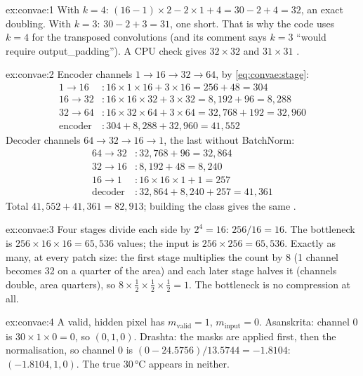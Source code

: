 
\begin{solution}{ex:convae:1}
With $k=4$: $(16-1)\times2-2\times1+4=30-2+4=32$, an exact doubling. With $k=3$: $30-2+3=31$, one short. That is why
the code uses $k=4$ for the transposed convolutions (and its comment says $k=3$ ``would require output\_padding''). A
CPU check gives $32\times32$ and $31\times31$ \tagC.
\end{solution}

\begin{solution}{ex:convae:2}
Encoder channels $1\to16\to32\to64$, by \cref{eq:convae:stage}:
\begin{align*}
1\to16 &: 16\times1\times16+3\times16 = 256+48 = 304\\
16\to32 &: 16\times16\times32+3\times32 = 8{,}192+96 = 8{,}288\\
32\to64 &: 16\times32\times64+3\times64 = 32{,}768+192 = 32{,}960\\
\text{encoder} &: 304+8{,}288+32{,}960 = 41{,}552
\end{align*}
Decoder channels $64\to32\to16\to1$, the last without BatchNorm:
\begin{align*}
64\to32 &: 32{,}768+96 = 32{,}864\\
32\to16 &: 8{,}192+48 = 8{,}240\\
16\to1 &: 16\times16\times1+1 = 257\\
\text{decoder} &: 32{,}864+8{,}240+257 = 41{,}361
\end{align*}
Total $41{,}552+41{,}361=82{,}913$; building the class gives the same \tagC.
\end{solution}

\begin{solution}{ex:convae:3}
Four stages divide each side by $2^4=16$: $256/16=16$. The bottleneck is $256\times16\times16=65{,}536$ values; the
input is $256\times256=65{,}536$. Exactly as many, at every patch size: the first stage multiplies the count by 8 (1
channel becomes 32 on a quarter of the area) and each later stage halves it (channels double, area quarters), so
$8\times\tfrac12\times\tfrac12\times\tfrac12=1$. The bottleneck is no compression at all.
\end{solution}

\begin{solution}{ex:convae:4}
A valid, hidden pixel has $m_\text{valid}=1$, $m_\text{input}=0$. Asanskrita: channel 0 is $30\times1\times0=0$, so
$(0,1,0)$. Drashta: the masks are applied first, then the normalisation, so channel 0 is
$(0-24.5756)/13.5744=-1.8104$: $(-1.8104, 1, 0)$. The true 30\,°C appears in neither.
\end{solution}

